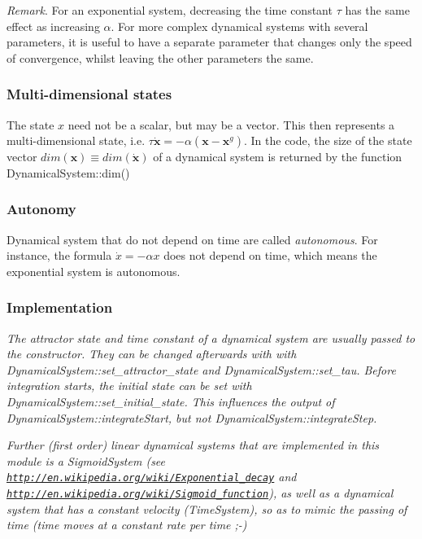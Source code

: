 {\itshape Remark}. For an exponential system, decreasing the time constant $\tau$ has the same effect as increasing $\alpha$. For more complex dynamical systems with several parameters, it is useful to have a separate parameter that changes only the speed of convergence, whilst leaving the other parameters the same.\hypertarget{page_dyn_sys_sec_dyn_sys_multi}{}\subsubsection{Multi-\/dimensional states}\label{page_dyn_sys_sec_dyn_sys_multi}
The state $x$ need not be a scalar, but may be a vector. This then represents a multi-\/dimensional state, i.\+e. $\tau\dot{\mathbf{x}} = -\alpha(\mathbf{x}-\mathbf{x}^g)$. In the code, the size of the state vector $dim(\mathbf{x})\equiv dim(\dot{\mathbf{x}})$ of a dynamical system is returned by the function Dynamical\+System\+::dim()\hypertarget{page_dyn_sys_sec_dyn_sys_autonomy}{}\subsubsection{Autonomy}\label{page_dyn_sys_sec_dyn_sys_autonomy}
Dynamical system that do not depend on time are called {\itshape autonomous}. For instance, the formula $ \dot{x} = -\alpha x$ does not depend on time, which means the exponential system is autonomous.\hypertarget{page_dyn_sys_Implementation}{}\subsubsection{Implementation}\label{page_dyn_sys_Implementation}
{\itshape  The attractor state and time constant of a dynamical system are usually passed to the constructor. They can be changed afterwards with with Dynamical\+System\+::set\+\_\+attractor\+\_\+state and Dynamical\+System\+::set\+\_\+tau. Before integration starts, the initial state can be set with Dynamical\+System\+::set\+\_\+initial\+\_\+state. This influences the output of Dynamical\+System\+::integrate\+Start, but not Dynamical\+System\+::integrate\+Step.}

{\itshape Further (first order) linear dynamical systems that are implemented in this module is a Sigmoid\+System (see \href{http://en.wikipedia.org/wiki/Exponential_decay}{\tt http\+://en.\+wikipedia.\+org/wiki/\+Exponential\+\_\+decay} and \href{http://en.wikipedia.org/wiki/Sigmoid_function}{\tt http\+://en.\+wikipedia.\+org/wiki/\+Sigmoid\+\_\+function}), as well as a dynamical system that has a constant velocity (Time\+System), so as to mimic the passing of time (time moves at a constant rate per time ;-\/)}


